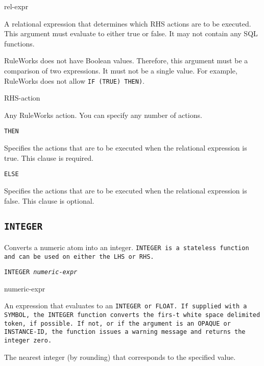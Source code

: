 \begin{arguments}
\item[rel-expr]

  A relational expression that determines which RHS actions are to be
  executed. This argument must evaluate to either true or false. It
  may not contain any SQL functions.
  \begin{note}
    RuleWorks does not have Boolean values. Therefore, this argument
    must be a comparison of two expressions. It must not be a single
    value. For example, RuleWorks does not allow
    \verb|IF (TRUE) THEN)|.
  \end{note}

\item[RHS-action]

  Any RuleWorks action. You can specify any number of actions.
\end{arguments}

\Clauses

\tt{THEN}

Specifies the actions that are to be executed when the
relational expression is true. This clause is required.

\tt{ELSE}

Specifies the actions that are to be executed when the
relational expression is false. This clause is optional.

\subsection{\tt{INTEGER}}

Converts a numeric atom into an integer. \tt{INTEGER} is a stateless
function and can be used on either the LHS or RHS.

\Format

\tt{INTEGER} \it{numeric-expr}

\begin{arguments}
\item[numeric-expr]

  An expression that evaluates to an \tt{INTEGER} or \tt{FLOAT}. If
  supplied with a \tt{SYMBOL}, the \tt{INTEGER} function converts the
  firs-t white space delimited token, if possible. If not, or if the
  argument is an \tt{OPAQUE} or \tt{INSTANCE-ID}, the function issues
  a warning message and returns the integer zero.
\end{arguments}

\ReturnValue

The nearest integer (by rounding) that corresponds to the
specified value.

